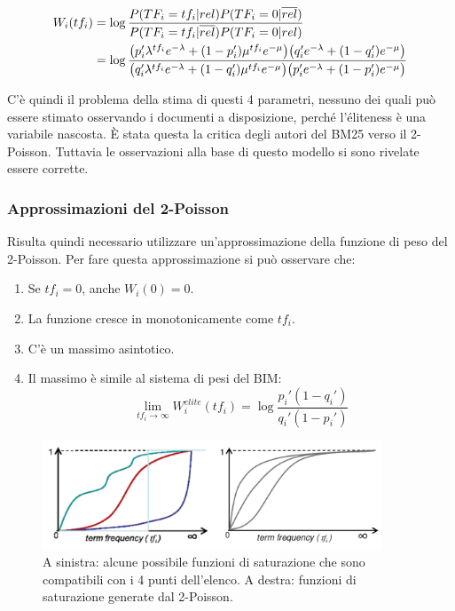 \begin{align}
W_i(tf_i) &=  \log\frac{ P(TF_i = tf_i | rel) P(TF_i = 0 | \overline{rel}) }{P(TF_i = tf_i | \overline{rel}) P(TF_i = 0 | rel)} \\
&= \log \frac{
\big(p_i'\lambda^{tf_i}e^{-\lambda} + (1-p_i')\mu^{tf_i}e^{-\mu}\big)\big(q_i'e^{-\lambda} + (1-q_i')e^{-\mu}\big)
}{
\big(q_i'\lambda^{tf_i}e^{-\lambda} + (1-q_i')\mu^{tf_i}e^{-\mu}\big)\big(p_i'e^{-\lambda} + (1-p_i')e^{-\mu}\big)
} \label{eq:wtf}
\end{align}


C'è quindi il problema della stima di questi 4 parametri, nessuno dei quali può essere stimato osservando i documenti a disposizione, perché l'éliteness è una variabile nascosta. \`E stata questa la critica degli autori del BM25 verso il 2-Poisson. Tuttavia le osservazioni alla base di questo modello si sono rivelate essere corrette.


\subsubsection{Approssimazioni del 2-Poisson}

Risulta quindi necessario utilizzare un'approssimazione della funzione di peso del 2-Poisson.
Per fare questa approssimazione si può osservare che:

\begin{enumerate}
	\item Se $tf_i = 0$, anche $W_i(0) = 0$.
	\item La funzione cresce in monotonicamente come $tf_i$.
	\item C'è un massimo asintotico.
	\item Il massimo è simile al sistema di pesi del BIM:
	$$
	\lim\limits_{tf_i \to \infty} W_i^{elite}(tf_i) = \log \frac{p_i'(1-q_i')}{q_i'(1-p_i')}
	$$
\end{enumerate}

\begin{figure}[htbp]
	\centering
	\includegraphics[width=0.9\textwidth]{images/l19-fig-1.png}
	\caption{A sinistra: alcune possibile funzioni di saturazione che sono compatibili con i 4 punti dell'elenco. A destra: funzioni di saturazione generate dal 2-Poisson.}
\end{figure}


